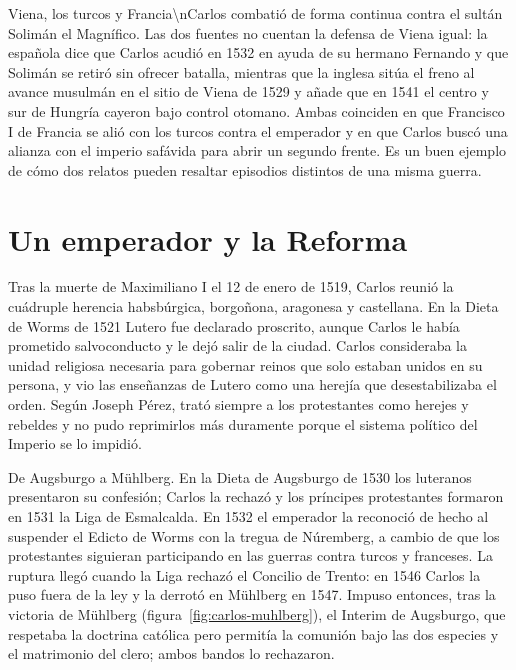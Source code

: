 \documentclass{book}
\begin{document}

Viena, los turcos y Francia\textbackslash{}nCarlos combatió de forma continua contra el sultán Solimán el Magnífico. Las dos fuentes no cuentan la defensa de Viena igual: la española dice que Carlos acudió en 1532 en ayuda de su hermano Fernando y que Solimán se retiró sin ofrecer batalla, mientras que la inglesa sitúa el freno al avance musulmán en el sitio de Viena de 1529 y añade que en 1541 el centro y sur de Hungría cayeron bajo control otomano. Ambas coinciden en que Francisco I de Francia se alió con los turcos contra el emperador y en que Carlos buscó una alianza con el imperio safávida para abrir un segundo frente. Es un buen ejemplo de cómo dos relatos pueden resaltar episodios distintos de una misma guerra.


\section{Un emperador y la Reforma}

Tras la muerte de Maximiliano I el 12 de enero de 1519, Carlos reunió la cuádruple herencia habsbúrgica, borgoñona, aragonesa y castellana. En la Dieta de Worms de 1521 Lutero fue declarado proscrito, aunque Carlos le había prometido salvoconducto y le dejó salir de la ciudad. Carlos consideraba la unidad religiosa necesaria para gobernar reinos que solo estaban unidos en su persona, y vio las enseñanzas de Lutero como una herejía que desestabilizaba el orden. Según Joseph Pérez, trató siempre a los protestantes como herejes y rebeldes y no pudo reprimirlos más duramente porque el sistema político del Imperio se lo impidió.


De Augsburgo a Mühlberg. En la Dieta de Augsburgo de 1530 los luteranos presentaron su confesión; Carlos la rechazó y los príncipes protestantes formaron en 1531 la Liga de Esmalcalda. En 1532 el emperador la reconoció de hecho al suspender el Edicto de Worms con la tregua de Núremberg, a cambio de que los protestantes siguieran participando en las guerras contra turcos y franceses. La ruptura llegó cuando la Liga rechazó el Concilio de Trento: en 1546 Carlos la puso fuera de la ley y la derrotó en Mühlberg en 1547. Impuso entonces, tras la victoria de Mühlberg (figura~\ref{fig:carlos-muhlberg}), el Interim de Augsburgo, que respetaba la doctrina católica pero permitía la comunión bajo las dos especies y el matrimonio del clero; ambos bandos lo rechazaron.
\end{document}
